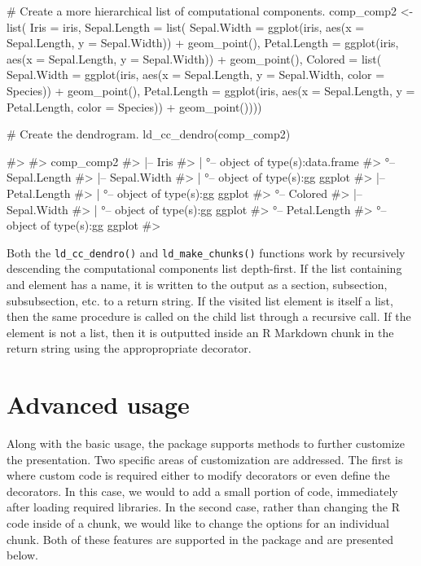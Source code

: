 \begin{Schunk}
\begin{Sinput}
# Create a more hierarchical list of computational components.
comp_comp2 <- list(
  Iris = iris,
  Sepal.Length = list(
    Sepal.Width = ggplot(iris, aes(x = Sepal.Length, y = Sepal.Width)) + geom_point(),
    Petal.Length = ggplot(iris, aes(x = Sepal.Length, y = Sepal.Width)) + geom_point(),
    Colored = list(
      Sepal.Width = ggplot(iris, aes(x = Sepal.Length, y = Sepal.Width, color = Species)) + 
        geom_point(),
      Petal.Length = ggplot(iris, aes(x = Sepal.Length, y = Petal.Length, color = Species)) + 
        geom_point())))

# Create the dendrogram.
ld_cc_dendro(comp_comp2)
\end{Sinput}
\begin{Soutput}
#> 
#>  comp_comp2
#>   |-- Iris
#>   |  °-- object of type(s):data.frame
#>   °-- Sepal.Length
#>    |-- Sepal.Width
#>    |  °-- object of type(s):gg ggplot
#>    |-- Petal.Length
#>    |  °-- object of type(s):gg ggplot
#>    °-- Colored
#>     |-- Sepal.Width
#>     |  °-- object of type(s):gg ggplot
#>     °-- Petal.Length
#>        °-- object of type(s):gg ggplot 
#> 
\end{Soutput}
\end{Schunk}

Both the \texttt{ld\_cc\_dendro()} and \texttt{ld\_make\_chunks()}
functions work by recursively descending the computational components
list depth-first. If the list containing and element has a name, it is
written to the output as a section, subsection, subsubsection, etc. to a
return string. If the visited list element is itself a list, then the
same procedure is called on the child list through a recursive call. If
the element is not a list, then it is outputted inside an R Markdown
chunk in the return string using the appropropriate decorator.

\hypertarget{advanced-usage}{%
\section{Advanced usage}\label{advanced-usage}}

Along with the basic usage, the  package supports methods
to further customize the presentation. Two specific areas of
customization are addressed. The first is where custom code is required
either to modify decorators or even define the decorators. In this case,
we would to add a small portion of code, immediately after loading
required libraries. In the second case, rather than changing the R code
inside of a chunk, we would like to change the options for an individual
chunk. Both of these features are supported in the package and are
presented below.

